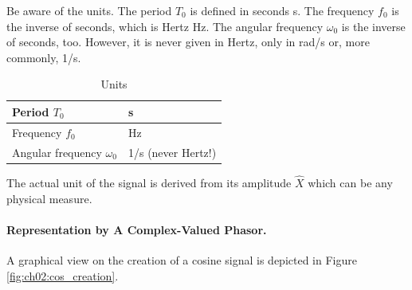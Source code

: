 \begin{refsection}
Be aware of the units. The period $T_0$ is defined in seconds \si{s}. The frequency $f_0$ is the inverse of seconds, which is Hertz \si{Hz}. The angular frequency $\omega_0$ is the inverse of seconds, too. However, it is never given in Hertz, only in \si{rad/s} or, more commonly, \si{1/s}.

\begin{table}[H]
	\centering
	\caption{Units}
	\begin{tabular}{|l|l|}
		\hline
		Period $T_0$ & \si{s} \\
		\hline
		Frequency $f_0$ & \si{Hz} \\
		\hline
		Angular frequency $\omega_0$ & \si{1/s} \; (never Hertz!) \\
		\hline
	\end{tabular}
\end{table}

The actual unit of the signal is derived from its amplitude $\hat{X}$ which can be any physical measure.

\paragraph{Representation by A Complex-Valued Phasor.}

A graphical view on the creation of a cosine signal is depicted in Figure \ref{fig:ch02:cos_creation}.

\begin{figure}[H]
	\centering
\end{figure}
\end{refsection}
